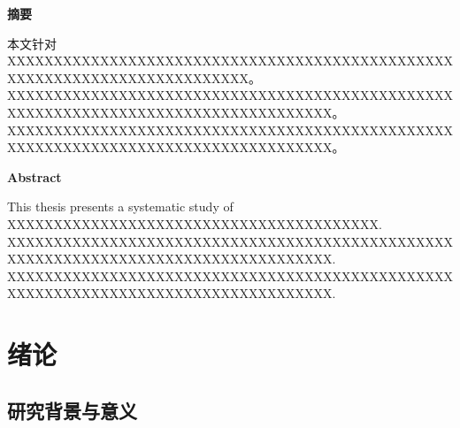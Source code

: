 \documentclass[a4paper, 12pt, twoside]{ctexart}
\def\contentsname{目\quad 录}
\newcommand{\frontmattertitle}[1]{%
  \vspace*{18pt}\begin{center}{\songti\bfseries\zihao{3}#1}\end{center}\vspace{18pt}}
\begin{document}
\newpage
\pagestyle{plain}

\frontmattertitle{摘\quad 要}
{}

本文针对XXXXXXXXXXXXXXXXXXXXXXXXXXXXXXXXXXXXXXXXXXXXXXXXXXXXXXXXXXXXXXXXXXXXXXXXXX。
XXXXXXXXXXXXXXXXXXXXXXXXXXXXXXXXXXXXXXXXXXXXXXXXXXXXXXXXXXXXXXXXXXXXXXXXXXXXXXXXXXX。
XXXXXXXXXXXXXXXXXXXXXXXXXXXXXXXXXXXXXXXXXXXXXXXXXXXXXXXXXXXXXXXXXXXXXXXXXXXXXXXXXXX。

\vspace{1cm}

\newpage
{}
\begin{center}{\bfseries{} Abstract}\end{center}\vspace{18pt}
{}

This thesis presents a systematic study of XXXXXXXXXXXXXXXXXXXXXXXXXXXXXXXXXXXXXXXX.
XXXXXXXXXXXXXXXXXXXXXXXXXXXXXXXXXXXXXXXXXXXXXXXXXXXXXXXXXXXXXXXXXXXXXXXXXXXXXXXXXXX.
XXXXXXXXXXXXXXXXXXXXXXXXXXXXXXXXXXXXXXXXXXXXXXXXXXXXXXXXXXXXXXXXXXXXXXXXXXXXXXXXXXX.

\vspace{1cm}

\newpage
{}
\begingroup
\def\contentsname{目\quad 录}
\tableofcontents
\endgroup
\ifodd\value{page}\newpage\thispagestyle{empty}\mbox{}\fi

\newpage
\pagestyle{fancy}

\section{绪论}

\subsection{研究背景与意义}
\end{document}
